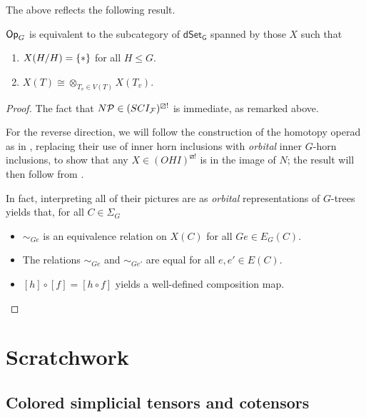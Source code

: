 \documentclass[a4paper,10pt
,draft
]{article}%
\renewcommand{\F}{\mathcal F}
\renewcommand{\1}{\ensuremath{\mathbb{id}}}
\begin{document}
The above reflects the following result.

\begin{proposition}
      $\mathsf{Op}_G$ is equivalent to the subcategory of $\mathsf{dSet_G}$ spanned by those $X$ such that
      \begin{enumerate}
      \item $X(H/H) = \set{\**}$ for all $H \leq G$.
      \item $X(T) \cong \otimes_{T_v \in V(T)}X(T_v)$. 
      \end{enumerate}
\end{proposition}
\begin{proof}
      The fact that $N\P \in (SCI_{\F})^{\boxslash !}$ is immediate, as remarked above.

      For the reverse direction, we will follow the construction of the homotopy operad as in \cite[\S 6]{MW09},
      replacing their use of inner horn inclusions with \textit{orbital} inner $G$-horn inclusions,
      to show that any $X \in (OHI)^{\boxslash !}$ is in the image of $N$; 
      the result will then follow from \cite[HYPER PROP]{BP18}.

      In fact, interpreting all of their pictures are as \textit{orbital} representations of $G$-trees yields that,
      for all $C \in \Sigma_G$
      \begin{itemize}
      \item $\sim_{G e}$ is an equivalence relation on $X(C)$ for all $Ge \in E_G(C)$.
      \item The relations $\sim_{G e}$ and $\sim_{G e'}$ are equal for all $e,e'\in E(C)$.
      \item $[h] \circ [f] = [h \circ f]$ yields a well-defined composition map.
      \end{itemize}
\end{proof}



\newpage



\section{Scratchwork}

\subsection{Colored simplicial tensors and cotensors}
\end{document}

